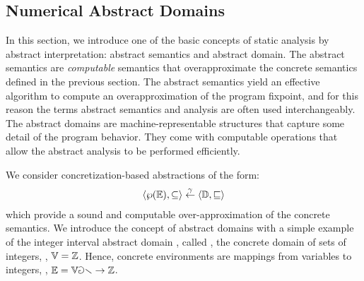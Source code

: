 \subsection{Numerical Abstract Domains}

In this section, we introduce one of the basic concepts of static analysis by abstract interpretation: abstract semantics and abstract domain. The abstract semantics are \emph{computable} semantics that overapproximate the concrete semantics defined in the previous section. The abstract semantics yield an effective algorithm to compute an overapproximation of the program fixpoint, and for this reason the terms abstract semantics and analysis are often used interchangeably. The abstract domains are machine-representable structures that capture some detail of the program behavior. They come with computable operations that allow the abstract analysis to be performed efficiently.

We consider concretization-based abstractions of the form:
\begin{align*}
  \langle \wp(\mathbb{E}), \subseteq \rangle \overset{\gamma}{\leftarrow} \langle \mathbb{D}, \sqsubseteq \rangle
\end{align*}
which provide a sound and computable over-approximation of the concrete semantics.
  We introduce the concept of abstract domains with a simple example of the integer interval abstract domain , called \intervalname, \wrt{} the concrete domain of sets of integers, \ie, $\mathbb{V} = \mathbb{Z}$.
  Hence, concrete environments are mappings from variables to integers, \ie, $\mathbb{E} = \mathbb{Var} \to \mathbb{Z}$.

